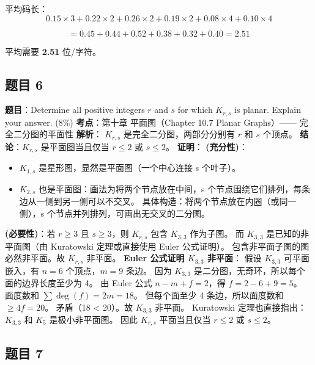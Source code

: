 \documentclass[10pt,a4paper,openany]{ctexbook}
\theoremstyle{definition}
\theoremstyle{remark}
\begin{document}
平均码长：
\[
0.15 \times 3 + 0.22 \times 2 + 0.26 \times 2 + 0.19 \times 2 + 0.08 \times 4 + 0.10 \times 4
\]

\[
= 0.45 + 0.44 + 0.52 + 0.38 + 0.32 + 0.40 = 2.51
\]

平均需要 \textbf{2.51} 位/字符。
\vspace{-2pt}

\subsection{题目 6}

\textbf{题目}：Determine all positive integers $r$ and $s$ for which $K_{r,s}$ is planar. Explain your answer. (8\%)
\textbf{考点}：第十章 平面图（Chapter 10.7 Planar Graphs）—— 完全二分图的平面性
\textbf{解析}：
$K_{r,s}$ 是完全二分图，两部分分别有 $r$ 和 $s$ 个顶点。
\textbf{结论}：$K_{r,s}$ 是平面图当且仅当 $r \leq 2$ 或 $s \leq 2$。
\textbf{证明}：
\textbf{(充分性)}：
\begin{itemize}
\item $K_{1,s}$ 是星形图，显然是平面图（一个中心连接 s 个叶子）。
\item $K_{2,s}$ 也是平面图：画法为将两个节点放在中间，s 个节点围绕它们排列，每条边从一侧到另一侧可以不交叉。
具体构造：将两个节点放在内圈（或同一侧），s 个节点并列排列，可画出无交叉的二分图。


\end{itemize}

\textbf{(必要性)}：若 $r \geq 3$ 且 $s \geq 3$，则 $K_{r,s}$ 包含 $K_{3,3}$ 作为子图。
而 $K_{3,3}$ 是已知的非平面图（由 Kuratowski 定理或直接使用 Euler 公式证明）。
包含非平面子图的图必然非平面。故 $K_{r,s}$ 非平面。
\textbf{Euler 公式证明 $K_{3,3}$ 非平面}：
假设 $K_{3,3}$ 可平面嵌入，有 $n = 6$ 个顶点，$m = 9$ 条边。
因为 $K_{3,3}$ 是二分图，无奇环，所以每个面的边界长度至少为 4。
由 Euler 公式 $n - m + f = 2$，得 $f = 2 - 6 + 9 = 5$。
面度数和 $\sum \deg(f) = 2m = 18$。
但每个面至少 4 条边，所以面度数和 $\geq 4f = 20$。
矛盾（18 < 20）。故 $K_{3,3}$ 非平面。
Kuratowski 定理也直接指出：$K_{3,3}$ 和 $K_5$ 是极小非平面图。
因此 $K_{r,s}$ 平面当且仅当 $r \leq 2$ 或 $s \leq 2$。
\vspace{-2pt}

\subsection{题目 7}
\end{document}
